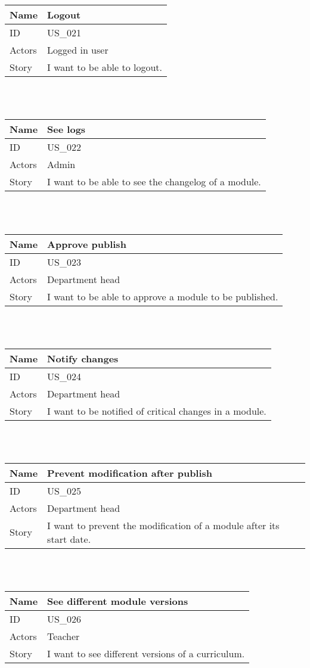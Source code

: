 \documentclass[12pt, a4paper]{article}
\newcommand\addrow[2]{#1 &#2\\ }
\newcommand\tabularhead{\begin{tabular}{lp{8cm}}
		\hline
	}
\newenvironment{usecase}{\tabularhead}
	{\hline\end{tabular}}
\begin{document}
~\\
~\\

		    \begin{usecase}
	\addrow{Name}{Logout}
	\hline
	\addrow{ID}{US\_021}
	\hline
	\addrow{Actors}{ Logged in user }
	\hline		
	\addrow{Story}{I want to be able to logout.}
\end{usecase}

~\\
~\\

		    \begin{usecase}
	\addrow{Name}{See logs}
	\hline
	\addrow{ID}{US\_022}
	\hline
	\addrow{Actors}{ Admin }
	\hline		
	\addrow{Story}{I want to be able to see the changelog of a module.}
\end{usecase}

~\\
~\\

		    \begin{usecase}
	\addrow{Name}{Approve publish}
	\hline
	\addrow{ID}{US\_023}
	\hline
	\addrow{Actors}{ Department head }
	\hline		
	\addrow{Story}{I want to be able to approve a module to be published.}
\end{usecase}

~\\
~\\

		    \begin{usecase}
	\addrow{Name}{Notify changes}
	\hline
	\addrow{ID}{US\_024}
	\hline
	\addrow{Actors}{ Department head }
	\hline		
	\addrow{Story}{I want to be notified of critical changes in a module.}
\end{usecase}

~\\
~\\

		    \begin{usecase}
	\addrow{Name}{Prevent modification after publish}
	\hline
	\addrow{ID}{US\_025}
	\hline
	\addrow{Actors}{ Department head }
	\hline		
	\addrow{Story}{I want to prevent the modification of a module after its start date.}
\end{usecase}

~\\
~\\
		    \begin{usecase}
	\addrow{Name}{See different module versions}
	\hline
	\addrow{ID}{US\_026}
	\hline
	\addrow{Actors}{ Teacher }
	\hline		
	\addrow{Story}{I want to see different versions of a curriculum.}
\end{usecase}

~\\
~\\
    
\end{document}
